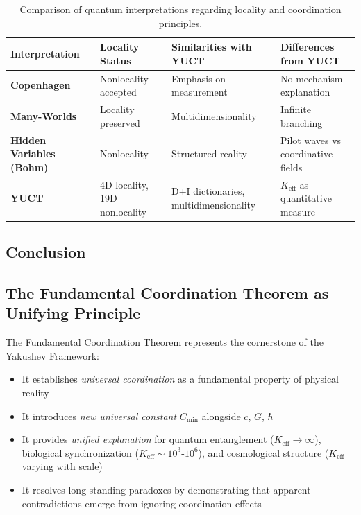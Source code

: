\documentclass[11pt,a4paper]{article}
\begin{document}
	\begin{table}[htbp]
		\centering
		\begin{tabular}{p{}p{}p{}p{}}
			\toprule
			\textbf{Interpretation} & \textbf{Locality Status} & \textbf{Similarities with YUCT} & \textbf{Differences from YUCT} \\
			\midrule
			\textbf{Copenhagen} & Nonlocality accepted & Emphasis on measurement & No mechanism explanation \\
			\textbf{Many-Worlds} & Locality preserved & Multidimensionality & Infinite branching \\
			\textbf{Hidden Variables (Bohm)} & Nonlocality & Structured reality & Pilot waves vs coordinative fields \\
			\textbf{YUCT} & 4D locality, 19D nonlocality & D+I dictionaries, multidimensionality & $K_{\mathrm{eff}}$ as quantitative measure \\
			\bottomrule
		\end{tabular}
		\caption{Comparison of quantum interpretations regarding locality and coordination principles.}
		\label{tab:interpretations}
	\end{table}
	
	\subsection{Conclusion}
	\label{subsec:epr-conclusion}
	\subsection{The Fundamental Coordination Theorem as Unifying Principle}
	
	The Fundamental Coordination Theorem represents the cornerstone of the Yakushev Framework:
	\begin{itemize}
		\item It establishes \emph{universal coordination} as a fundamental property of physical reality
		\item It introduces \emph{new universal constant} $C_{\min}$ alongside $c$, $G$, $\hbar$
		\item It provides \emph{unified explanation} for quantum entanglement ($K_{\mathrm{eff}} \to \infty$), biological synchronization ($K_{\mathrm{eff}} \sim 10^3$-$10^6$), and cosmological structure ($K_{\mathrm{eff}}$ varying with scale)
		\item It resolves long-standing paradoxes by demonstrating that apparent contradictions emerge from ignoring coordination effects
	\end{itemize}
	
\end{document}
